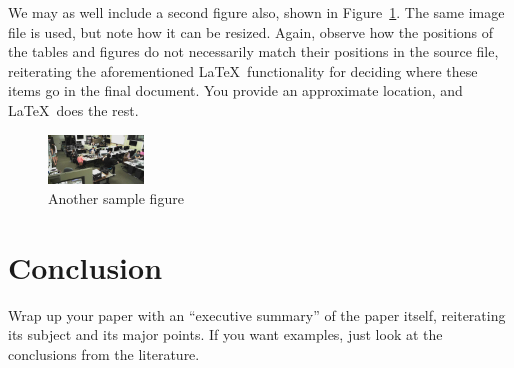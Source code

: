 \documentclass{article}
\begin{document}
We may as well include a second figure also, shown in Figure~\ref{figure-sample2}.  The same image file is used, but note how it can be resized.  Again, observe how the positions of the tables and figures do not necessarily match their positions in the source file, reiterating the aforementioned \LaTeX\ functionality for deciding where these items go in the final document.  You provide an approximate location, and \LaTeX\ does the rest.

\begin{figure}
\centering
\includegraphics[width=1in]{space.jpg} 

\caption{Another sample figure}
\label{figure-sample2}
\end{figure}

\section{Conclusion}


Wrap up your paper with an ``executive summary'' of the paper itself, reiterating its subject and its major points.  If you want examples, just look at the conclusions from the literature.


{}

\end{document}
